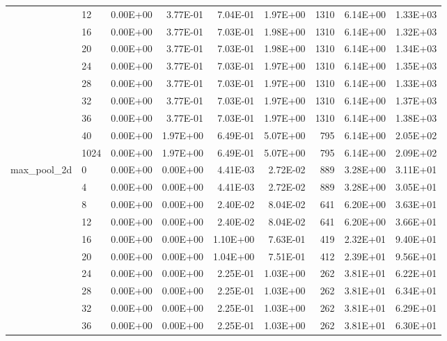 \begin{longtable}{llrrrrrrr}
         & 12   &   0.00E+00 & 3.77E-01 & 7.04E-01 & 1.97E+00 &    1310 &     6.14E+00 & 1.33E+03 \\
         & 16   &   0.00E+00 & 3.77E-01 & 7.03E-01 & 1.98E+00 &    1310 &     6.14E+00 & 1.32E+03 \\
         & 20   &   0.00E+00 & 3.77E-01 & 7.03E-01 & 1.98E+00 &    1310 &     6.14E+00 & 1.34E+03 \\
         & 24   &   0.00E+00 & 3.77E-01 & 7.03E-01 & 1.97E+00 &    1310 &     6.14E+00 & 1.35E+03 \\
         & 28   &   0.00E+00 & 3.77E-01 & 7.03E-01 & 1.97E+00 &    1310 &     6.14E+00 & 1.33E+03 \\
         & 32   &   0.00E+00 & 3.77E-01 & 7.03E-01 & 1.97E+00 &    1310 &     6.14E+00 & 1.37E+03 \\
         & 36   &   0.00E+00 & 3.77E-01 & 7.03E-01 & 1.97E+00 &    1310 &     6.14E+00 & 1.38E+03 \\
         & 40   &   0.00E+00 & 1.97E+00 & 6.49E-01 & 5.07E+00 &     795 &     6.14E+00 & 2.05E+02 \\
         & 1024 &   0.00E+00 & 1.97E+00 & 6.49E-01 & 5.07E+00 &     795 &     6.14E+00 & 2.09E+02 \\
max\_pool\_2d & 0    &   0.00E+00 & 0.00E+00 & 4.41E-03 & 2.72E-02 &     889 &     3.28E+00 & 3.11E+01 \\
         & 4    &   0.00E+00 & 0.00E+00 & 4.41E-03 & 2.72E-02 &     889 &     3.28E+00 & 3.05E+01 \\
         & 8    &   0.00E+00 & 0.00E+00 & 2.40E-02 & 8.04E-02 &     641 &     6.20E+00 & 3.63E+01 \\
         & 12   &   0.00E+00 & 0.00E+00 & 2.40E-02 & 8.04E-02 &     641 &     6.20E+00 & 3.66E+01 \\
         & 16   &   0.00E+00 & 0.00E+00 & 1.10E+00 & 7.63E-01 &     419 &     2.32E+01 & 9.40E+01 \\
         & 20   &   0.00E+00 & 0.00E+00 & 1.04E+00 & 7.51E-01 &     412 &     2.39E+01 & 9.56E+01 \\
         & 24   &   0.00E+00 & 0.00E+00 & 2.25E-01 & 1.03E+00 &     262 &     3.81E+01 & 6.22E+01 \\
         & 28   &   0.00E+00 & 0.00E+00 & 2.25E-01 & 1.03E+00 &     262 &     3.81E+01 & 6.34E+01 \\
         & 32   &   0.00E+00 & 0.00E+00 & 2.25E-01 & 1.03E+00 &     262 &     3.81E+01 & 6.29E+01 \\
         & 36   &   0.00E+00 & 0.00E+00 & 2.25E-01 & 1.03E+00 &     262 &     3.81E+01 & 6.30E+01 \\

\end{longtable}
